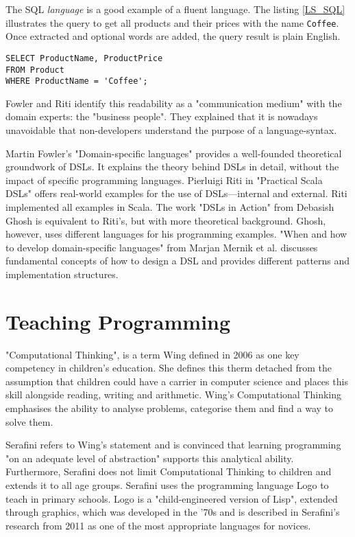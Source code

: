 The SQL \textit{language} is a good example of a fluent language. The listing \ref{LS_SQL} illustrates the query to get all products and their prices with the name \texttt{Coffee}. Once extracted and optional words are added, the query result is plain English.

\begin{lstlisting}[caption={SQL Fluent Language Example.}, label=LS_SQL]
SELECT ProductName, ProductPrice
FROM Product
WHERE ProductName = 'Coffee';
\end{lstlisting}

Fowler and Riti identify this readability as a "communication medium" with the domain experts: the "business people".\cite{Fowler2010, Riti2018} They explained that it is nowadays unavoidable that non-developers understand the purpose of a language-syntax.

Martin Fowler's "Domain-specific languages"\cite{Fowler2010} provides a well-founded theoretical groundwork of DSLs. It explains the theory behind DSLs in detail, without the impact of specific programming languages. Pierluigi Riti in "Practical Scala DSLs"\cite{Riti2018} offers real-world examples for the use of DSLs—internal and external. Riti implemented all examples in Scala. The work "DSLs in Action"\cite{Ghosh2010} from Debasish Ghosh is equivalent to Riti's, but with more theoretical background. Ghosh, however, uses different languages for his programming examples. "When and how to develop domain-specific languages"\cite{Mernik2005} from Marjan Mernik et al. discusses fundamental concepts of how to design a DSL and provides different patterns and implementation structures.

\section{Teaching Programming}
\label{LIT_TEACH}
"Computational Thinking", is a term Wing defined in 2006 as one key competency in children's education.\cite{Wing2006} She defines this therm detached from the assumption that children could have a carrier in computer science and places this skill alongside reading, writing and arithmetic. Wing's Computational Thinking emphasises the ability to analyse problems, categorise them and find a way to solve them.

Serafini refers to Wing's statement and is convinced that learning programming "on an adequate level of abstraction" supports this analytical ability.\cite{Serafini2011} Furthermore, Serafini does not limit Computational Thinking to children and extends it to all age groups. Serafini uses the programming language Logo to teach in primary schools. Logo is a "child-engineered version of Lisp"\cite{Kahn1995}, extended through graphics, which was developed in the '70s and is described in Serafini's research from 2011 as one of the most appropriate languages for novices.

